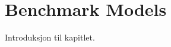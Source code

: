 \documentclass[../../main.tex]{subfiles}
\begin{document}

\section{Benchmark Models}

Introduksjon til kapitlet.

\end{document}
